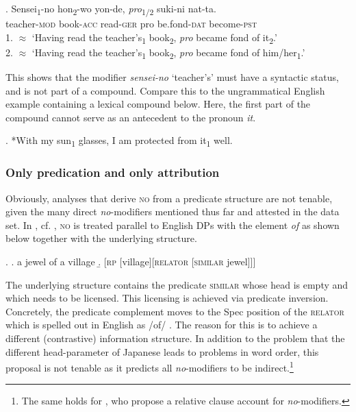 \exg. Sensei\textsubscript{1}-no hon\textsubscript{2}-wo yon-de, \textit{pro}\textsubscript{1/2} suki-ni nat-ta.\\
teacher-\textsc{mod} book-\textsc{acc} read-\textsc{ger} pro be.fond-\textsc{dat} become-\textsc{pst}\\
1. $\approx$ `Having read the teacher’s\textsubscript{1} book\textsubscript{2}, \textit{pro} became fond of it\textsubscript{2}.’\\
2. $\approx$ `Having read the teacher’s\textsubscript{1} book\textsubscript{2}, \textit{pro} became fond of him/her\textsubscript{1}.’ \label{3:senseinohon}

This shows that the modifier \textit{sensei-no} `teacher’s’ must have a syntactic status, and is not part of a compound. Compare this to the ungrammatical  English example containing a lexical compound below. Here, the first part of the compound cannot serve as an antecedent to the pronoun \textit{it}.

\ex. *With my sun\textsubscript{1} glasses, I am protected from it\textsubscript{1} well. \\ \null \hfill \citep[37]{rae:2010:ordering}

\subsubsection{Only predication and only attribution}

Obviously, analyses that derive \textsc{no} from a predicate structure are not tenable, given the many direct \textit{no}-modifiers mentioned thus far and attested in the data set. In \citet{dikken:2004:complex}, cf. \citet{dikken:2006:relators, moro:1997:raising}, \textsc{no} is treated parallel to English DPs with the element \textit{of} as shown below together with the underlying structure. 

\ex. \a. a jewel of a village \hfill \citep[162]{dikken:2006:relators}
\b. [\textsc{rp} [village][\textsc{relator} [\textsc{similar} jewel]]] \hfill \citep[178]{dikken:2006:relators}

The underlying structure contains the predicate \textsc{similar} whose head is empty and which needs to be licensed. This licensing is achieved via predicate inversion. Concretely, the predicate complement moves to the Spec position of the \textsc{relator} which is spelled out in English as /of/ \citep[§ 5]{dikken:2006:relators}. The reason for this is to achieve a different (contrastive) information structure. In addition to the problem that the different head-parameter of Japanese leads to problems in word order, this proposal is not tenable as it predicts all \textit{no}-modifiers to be indirect.\footnote{The same holds for \citet{koopman:2016:further}, who propose a relative clause account for \textit{no}-modifiers.}

